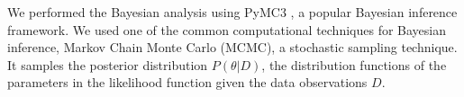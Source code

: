 We performed the Bayesian analysis using PyMC3 \cite{salvatier2016probabilistic}, 
a popular Bayesian inference framework. We used one of the common computational techniques for Bayesian inference, Markov Chain Monte Carlo (MCMC), a stochastic sampling technique. It samples the posterior distribution $P(\theta | D)$, the distribution functions of the parameters in the likelihood function given the data observations $D$. 






